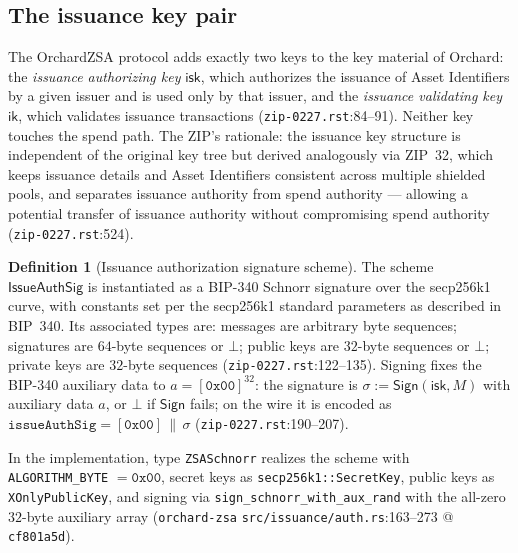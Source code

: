 \documentclass[11pt,a4paper]{article}
\theoremstyle{definition}
\newtheorem{definition}[theorem]{Definition}
\begin{document}
\subsection{The issuance key pair}\label{sec:zsa-issuance-keys}

The OrchardZSA protocol adds exactly two keys to the key material of
Orchard: the \emph{issuance authorizing key} $\mathsf{isk}$, which
authorizes the issuance of Asset Identifiers by a given issuer and is used
only by that issuer, and the \emph{issuance validating key} $\mathsf{ik}$,
which validates issuance transactions (\texttt{zip-0227.rst}:84--91).
Neither key touches the spend path. The ZIP's rationale: the issuance key
structure is independent of the original key tree but derived analogously
via ZIP~32, which keeps issuance details and Asset Identifiers consistent
across multiple shielded pools, and separates issuance authority from spend
authority --- allowing a potential transfer of issuance authority without
compromising spend authority (\texttt{zip-0227.rst}:524).

\begin{definition}[Issuance authorization signature scheme]
\label{def:zsa-issueauthsig}
The scheme $\mathsf{IssueAuthSig}$ is instantiated as a BIP-340 Schnorr
signature over the secp256k1 curve, with constants set per the secp256k1
standard parameters as described in BIP~340. Its associated types are:
messages are arbitrary byte sequences; signatures are $64$-byte sequences
or $\bot$; public keys are $32$-byte sequences or $\bot$; private keys are
$32$-byte sequences (\texttt{zip-0227.rst}:122--135). Signing fixes the
BIP-340 auxiliary data to $a = [\mathtt{0x00}]^{32}$: the signature is
$\sigma := \mathsf{Sign}(\mathsf{isk}, M)$ with auxiliary data $a$, or
$\bot$ if $\mathsf{Sign}$ fails; on the wire it is encoded as
$\mathtt{issueAuthSig} = [\mathtt{0x00}] \,\|\, \sigma$
(\texttt{zip-0227.rst}:190--207).
\end{definition}

In the implementation, type \texttt{ZSASchnorr} realizes the scheme with
\texttt{ALGORITHM\_BYTE} $= \mathtt{0x00}$, secret keys as
\texttt{secp256k1::SecretKey}, public keys as \texttt{XOnlyPublicKey}, and
signing via \texttt{sign\_schnorr\_with\_aux\_rand} with the all-zero
$32$-byte auxiliary array (\texttt{orchard-zsa}
\texttt{src/issuance/auth.rs}:163--273 @ \texttt{cf801a5d}).
\end{document}
